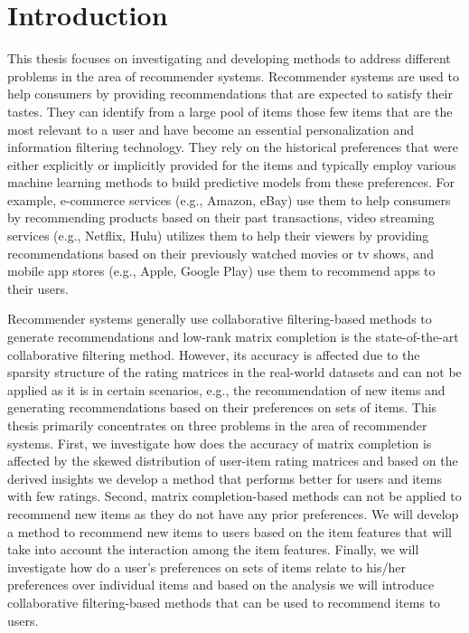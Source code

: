 \chapter{Introduction}
\label{ch:intro}

This thesis focuses on investigating and developing methods to address
different problems in the area of recommender systems. 
Recommender systems are used to help consumers by providing recommendations
that are expected to satisfy their tastes. 
They can identify from a large pool of items those few
items that are the most relevant to a user and have become an essential
personalization and information filtering technology. They rely on the historical
preferences that were either explicitly or implicitly provided for the items and
typically employ various machine learning methods to build predictive models from
these preferences. 
For example, e-commerce services (e.g., Amazon, eBay) use them to help consumers by
recommending products based on their past transactions, video streaming services
(e.g., Netflix, Hulu) utilizes them to help their viewers by providing
recommendations based on their
previously watched movies or tv shows, and mobile app stores (e.g., Apple, Google Play)
use them to recommend apps to their users.


Recommender systems generally use collaborative filtering-based methods to generate
recommendations and low-rank matrix completion is the state-of-the-art collaborative
filtering method. However, its accuracy is affected due to the sparsity structure of
the rating matrices in the real-world datasets and can not be applied as it is in
certain scenarios, e.g., the recommendation of new items and generating recommendations
based on their preferences on sets of items. This thesis primarily concentrates on
three problems in the area of recommender systems. First, we investigate how does
the accuracy of matrix completion is affected by the skewed distribution of user-item rating
matrices and based on the derived insights we develop a method that performs better for
users and items with few ratings. Second, matrix completion-based methods can not be
applied to recommend new items as they do not have any prior preferences. We will
develop a method to recommend new items to users based on the item features that will take
into account the interaction among the item features. Finally, we will investigate how do
a user's preferences on sets of items relate to his/her preferences over individual items
and based on the analysis we will introduce collaborative filtering-based methods that can
be used to recommend items to users.


